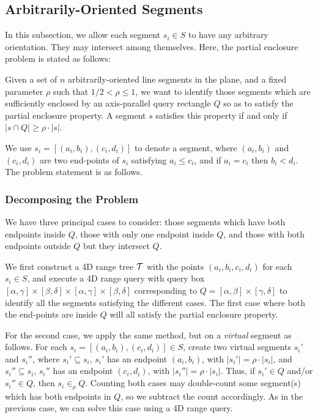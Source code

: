 \subsection{Arbitrarily-Oriented Segments}
\label{:rectangles:ao}

In this subsection, we allow each segment $s_i \in S$ to have any 
arbitrary orientation. They may intersect among themselves. 
Here, the partial enclosure problem is stated as follows:

\begin{problem}
Given a set of $n$ arbitrarily-oriented line segments in the plane, and a 
fixed parameter $\rho$ such that $1/2 < \rho \leq 1$, we want to identify 
those segments which are sufficiently enclosed by an axis-parallel query 
rectangle $Q$ so as to satisfy the partial enclosure property. A segment 
$s$ satisfies this property if and only if $|s \cap Q| \geq \rho \cdot |s|$.
\end{problem}



We use $s_i= [(a_i,b_i), (c_i,d_i)]$ to denote a segment, where $(a_i,b_i)$ 
and $(c_i,d_i)$ are two end-points of $s_i$ satisfying $a_i\leq c_i$, 
and if $a_i = c_i$ then $b_i < d_i$. The problem statement is as 
follows.




\subsubsection{Decomposing the Problem}
\label{:rectangles:ao:approach}

We have three principal cases to consider:  those segments which 
have both endpoints inside $Q$,  those with only one endpoint inside 
$Q$, and  those with both endpoints outside $Q$ but they intersect $Q$.  

We first construct a 4D range tree $\cal T$ with the points $(a_i, b_i, c_i, 
d_i)$ 
for each $s_i \in S$, and execute a 4D range query with query box 
$[\alpha, \gamma] \times [\beta, \delta] \times [\alpha, \gamma] \times 
[\beta, \delta]$ corresponding to $Q=[\alpha,\beta] \times [\gamma,\delta]$ 
to identify all the segments satisfying the different cases. 
The first case where both the end-points are inside $Q$ will all satisfy the 
partial enclosure property.

For the second case, we apply the same method, but on a {\it virtual} segment as 
follows. For each $s_i=
[(a_i,b_i),(c_i,d_i)] \in S$, create two virtual segments $s_i'$ and 
$s_i''$, where $s_i' \subseteq s_i$, $s_i'$ has an endpoint $(a_i,b_i)$, 
with $|s_i'| = \rho \cdot |s_i|$, and $s_i'' \subseteq s_i$, $s_i''$ 
has an endpoint $(c_i,d_i)$, with $|s_i''| = \rho \cdot |s_i|$. Thus, if 
$s_i' \in Q$ and/or $s_i'' \in Q$, then $s_i \in_\rho Q$. Counting both 
cases may double-count some 
segment(s) which has both endpoints in $Q$, so we subtract the count 
accordingly. 
As in the previous case, we can solve this case using a 4D range query.

